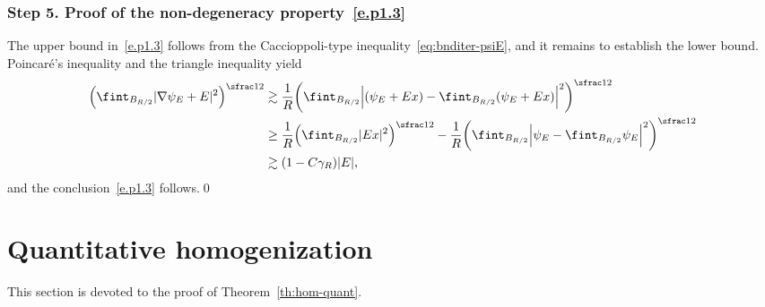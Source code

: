 \documentclass[JEP,XML,SOM,Unicode,published]{cedram}
\theoremstyle{plain}
\theoremstyle{definition}
\newcommand{\step}[1]{\subsubsection*{Step #1}}
\begin{document}
\step{5. Proof of the non-degeneracy property~\eqref{e.p1.3}}
The upper bound in~\eqref{e.p1.3} follows from the Caccioppoli-type inequality~\eqref{eq:bnditer-psiE}, and it remains to establish the lower bound.
Poincaré's inequality and the triangle inequality yield
\begin{align*}
\Big(\fint_{B_{R/2}}|\nabla \psi_E+E|^2\Big)^{\sfrac12}&\gtrsim \frac1{R} \bigg(\fint_{B_{R/2}}\Big|(\psi_E+Ex)-\fint_{B_{R/2}}(\psi_E+Ex)\Big|^2\bigg)^{\sfrac12}
\\
&\ge \frac1{R} \Big(\fint_{B_{R/2}}|E x|^2\Big)^{\sfrac12} - \frac1{R} \bigg(\fint_{B_{R/2}}\Big| \psi_E-\fint_{B_{R/2}} \psi_E\Big|^2\bigg)^{\sfrac12}\\
&\gtrsim(1-C\gamma_R)|E|,
\end{align*}
and the conclusion~\eqref{e.p1.3} follows.\qed

\section{Quantitative homogenization}
This section is devoted to the proof of Theorem~\ref{th:hom-quant}.
\end{document}
